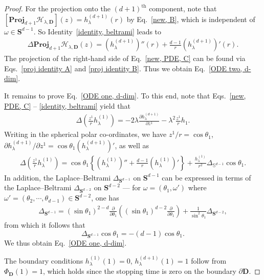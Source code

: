 \documentclass[11pt,a4paper,english,reqno]{amsart}
\theoremstyle{plain}
\newcommand{\p}{\partial}
\newcommand{\1}{\mathbbm{1}}
\newcommand{\proj}{\mathbf{Proj}}
\begin{document}
\begin{proof}
For the projection onto the $(d+1)^{\text{th}}$ component, note that $\left[\proj_{d+1} \mathcal{H}_{\lambda,\mathbf{D}}\right](z)=h_\lambda^{(d+1)}(r)$  by Eq.~\eqref{new, B}, which is independent of $\omega \in \mathbf{S}^{d-1}$. So Identity~\eqref{identity, beltrami} leads to
\begin{align*}
    \Delta \proj_{d+1} \mathcal{H}_{\lambda,\mathbf{D}}(z) = \left(h_\lambda^{(d+1)}\right)''(r) + \frac{d-1}{r}\left(h_\lambda^{(d+1)}\right)'(r).
\end{align*}
The projection of the right-hand side of Eq.~\eqref{new, PDE, C} can be found via Eqs.~\eqref{proj identity A} and \eqref{proj identity B}. Thus we obtain Eq.~\eqref{ODE two, d-dim}. 


It remains to prove Eq.~\eqref{ODE one, d-dim}. To this end, note that Eqs.~\eqref{new, PDE, C} -- \eqref{identity, beltrami} yield that
\begin{align*}
    \Delta\left(\frac{z^1}{r} h_\lambda^{(1)}\right) = -2\lambda \frac{\p h_\lambda^{(d+1)}}{\p z^1} - \lambda^2\frac{z^1}{r}  h_1.
\end{align*}
Writing in the spherical polar co-ordinates, we have $z^1\slash r = \cos\theta_1$, $\p h_\lambda^{(d+1)}\slash{\p z^1} = \cos\theta_1 \left( h_\lambda^{(d+1)} \right)'$, as well as 
\begin{align*}
     \Delta\left(\frac{z^1}{r} h_\lambda^{(1)}\right) = \cos\theta_1\left\{ \left(h_\lambda^{(1)}\right)''+\frac{d-1}{r}\left(h_\lambda^{(1)}\right)'\right\}  + \frac{h_\lambda^{(1)}}{r^2} \Delta_{\mathbb{S}^{d-1}} \cos\theta_1.
\end{align*}
In addition, the Laplace--Beltrami $\Delta_{\mathbf{S}^{d-1}}$ on $\mathbf{S}^{d-1}$ can be expressed in terms of the Laplace--Beltrami $\Delta_{\mathbf{S}^{d-2}}$ on $\mathbf{S}^{d-2}$ --- for $\omega = (\theta_1, \omega')$ where $\omega'=(\theta_2,\cdots,\theta_{d-1}) \in \mathbf{S}^{d-2}$, one has
\begin{align*}
    \Delta_{\mathbf{S}^{d-1}} = \left(\sin\theta_1\right)^{2-d} \frac{\p}{\p\theta_1} \left( \left(\sin\theta_1\right)^{d-2}\frac{\p}{\p \theta_1} \right) + \frac{1}{\sin^2 \theta_1} \Delta_{\mathbf{S}^{d-2}},
\end{align*}
from which it follows that $$\Delta_{\mathbf{S}^{d-1}} \cos\theta_1 = -(d-1)\cos\theta_1.$$ We thus obtain Eq.~\eqref{ODE one, d-dim}.

The boundary conditions $h^{(1)}_\lambda (1) = 0$, $h^{(d+1)}_\lambda(1)=1$ follow from $\Phi_{\mathbf{D}}(1)=1$, which holds since the stopping time is zero on the boundary $\p\mathbf{D}$.   \end{proof}
\end{document}
